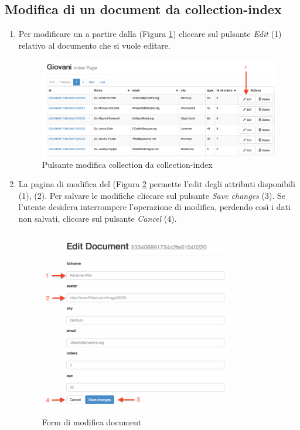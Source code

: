 	\subsection{Modifica di un document da collection-index} %
	\label{modificadocumentdacollectionindex}
		\begin{enumerate}

			\item Per modificare un  a partire dalla  (Figura \ref{fig:modificadocumentdacollectionindex}) cliccare sul pulsante \emph{Edit} (1) relativo al documento che si vuole editare. 

				\begin{figure}[H]
					\centering \includegraphics[width=1\textwidth]{img/modificadocumentdacollectionindex.png}
				\caption{\label{fig:modificadocumentdacollectionindex} Pulsante modifica collection da collection-index}
				\end{figure}

			\item \label{modificaDocumentForm} La pagina di modifica del  (Figura \ref{fig:modificaDocumentForm} permette l'edit degli attributi disponibili (1), (2). Per salvare le modifiche cliccare sul pulsante \emph{Save changes} (3). Se l'utente desidera interrompere l'operazione di modifica, perdendo così i dati non salvati, cliccare sul pulsante \emph{Cancel} (4). 

				\begin{figure}[H]
					\centering \includegraphics[width=0.8\textwidth]{img/modificaDocumentForm.png}
					\caption{\label{fig:modificaDocumentForm} Form di modifica document}
				\end{figure}


\end{enumerate}
